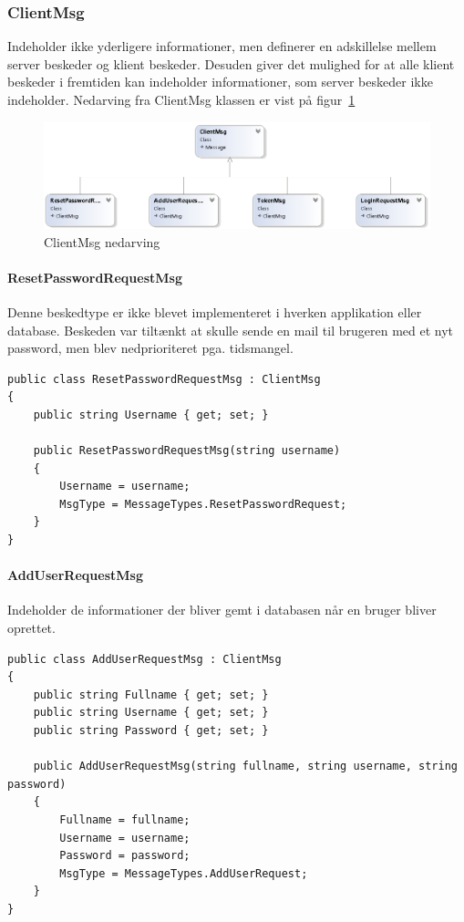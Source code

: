 \subsubsection{ClientMsg}
Indeholder ikke yderligere informationer, men definerer en adskillelse mellem server beskeder og klient beskeder. Desuden giver det mulighed for at alle klient beskeder i fremtiden kan indeholder informationer, som server beskeder ikke indeholder. Nedarving fra ClientMsg klassen er vist på figur~\ref{fig:ClientMsgUML}

\begin{figure}
	\centering
	\includegraphics[width=0.7\linewidth]{figs/connection/ClientMsgUML.png}
	\caption{ClientMsg nedarving}
	\label{fig:ClientMsgUML}
\end{figure}

\paragraph{ResetPasswordRequestMsg}
Denne beskedtype er ikke blevet implementeret i hverken applikation eller database. Beskeden var tiltænkt at skulle sende en mail til brugeren med et nyt password, men blev nedprioriteret pga. tidsmangel.
\begin{lstlisting}[caption=ResetPasswordRequestMsg, label=code:ResetPasswordRequestMsg]
public class ResetPasswordRequestMsg : ClientMsg
{
	public string Username { get; set; }
	
	public ResetPasswordRequestMsg(string username)
	{
		Username = username;
		MsgType = MessageTypes.ResetPasswordRequest;
	}
}
\end{lstlisting}

\paragraph{AddUserRequestMsg}
Indeholder de informationer der bliver gemt i databasen når en bruger bliver oprettet.
\begin{lstlisting}[caption=AddUserRequestMsg, label=code:AddUserRequestMsg]
public class AddUserRequestMsg : ClientMsg
{
	public string Fullname { get; set; }
	public string Username { get; set; }
	public string Password { get; set; }
	
	public AddUserRequestMsg(string fullname, string username, string password)
	{
		Fullname = fullname;
		Username = username;
		Password = password;
		MsgType = MessageTypes.AddUserRequest;
	}
}
\end{lstlisting}

